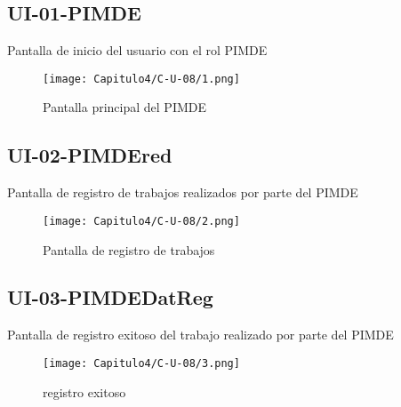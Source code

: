 




\subsection{UI-01-PIMDE}
    Pantalla de inicio del usuario con el rol PIMDE
\begin{figure}[htbp!]
\centering
    \texttt{[image: Capitulo4/C-U-08/1.png]}
    \caption{Pantalla principal del PIMDE}
    \label{fig:my_label}
\end{figure}
\clearpage


\subsection{UI-02-PIMDEred}
    Pantalla de registro de trabajos realizados por parte del PIMDE
\begin{figure}[htbp!]
\centering
    \texttt{[image: Capitulo4/C-U-08/2.png]}
    \caption{Pantalla de registro de trabajos}
    \label{fig:my_label}
\end{figure}



\clearpage


\subsection{UI-03-PIMDEDatReg}
    Pantalla de registro exitoso del trabajo realizado por parte del PIMDE
\begin{figure}[htbp!]
\centering
    \texttt{[image: Capitulo4/C-U-08/3.png]}
    \caption{registro exitoso}
    \label{fig:my_label}
\end{figure}
\clearpage



